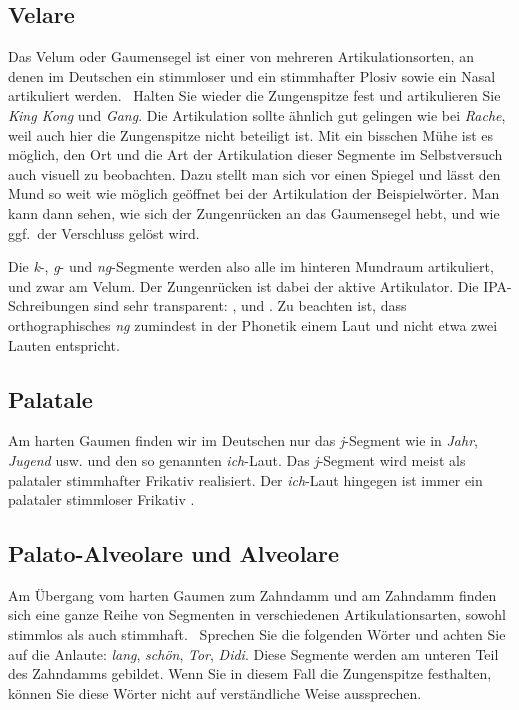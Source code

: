 \subsection{Velare}

\label{sec:velar}


Das Velum oder Gaumensegel ist einer von mehreren Artikulationsorten, an denen im Deutschen ein stimmloser und ein stimmhafter Plosiv sowie ein Nasal artikuliert werden.
\TuBegin~Halten Sie wieder die Zungenspitze fest und artikulieren Sie \textit{King Kong} und \textit{Gang}.
Die Artikulation sollte ähnlich gut gelingen wie bei \textit{Rache}, weil auch hier die Zungenspitze nicht beteiligt ist.
Mit ein bisschen Mühe ist es möglich, den Ort und die Art der Artikulation dieser Segmente im Selbstversuch auch visuell zu beobachten.
Dazu stellt man sich vor einen Spiegel und lässt den Mund so weit wie möglich geöffnet bei der Artikulation der Beispielwörter.
Man kann dann sehen, wie sich der Zungenrücken an das Gaumensegel hebt, und wie ggf.\ der Verschluss gelöst wird.

Die \textit{k}-, \textit{g}- und \textit{ng}-Segmente werden also alle im hinteren Mundraum artikuliert, und zwar am Velum.
Der Zungenrücken ist dabei der aktive Artikulator.
Die IPA-Schreibungen sind sehr transparent: \textipa{[k]}, \textipa{[g]} und \textipa{[N]}.
Zu beachten ist, dass orthographisches \textit{ng} zumindest in der Phonetik einem Laut und nicht etwa zwei Lauten entspricht.

\subsection{Palatale}


Am harten Gaumen finden wir im Deutschen nur das \textit{j}-Segment wie in \textit{Jahr}, \textit{Jugend} usw. und den so genannten \textit{ich}-Laut.
Das \textit{j}-Segment wird meist als palataler stimmhafter Frikativ \textipa{[J]} realisiert.
Der \textit{ich}-Laut hingegen ist immer ein palataler stimmloser Frikativ \textipa{[\c{c}]}.

\subsection{Palato-Alveolare und Alveolare}


Am Übergang vom harten Gaumen zum Zahndamm und am Zahndamm finden sich eine ganze Reihe von Segmenten in verschiedenen Artikulationsarten, sowohl stimmlos als auch stimmhaft.
\TuBegin~Sprechen Sie die folgenden Wörter und achten Sie auf die Anlaute: \textit{lang}, \textit{schön}, \textit{Tor}, \textit{Didi}.
Diese Segmente werden am unteren Teil des Zahndamms gebildet.
Wenn Sie in diesem Fall die Zungenspitze festhalten, können Sie diese Wörter nicht auf verständliche Weise aussprechen.

